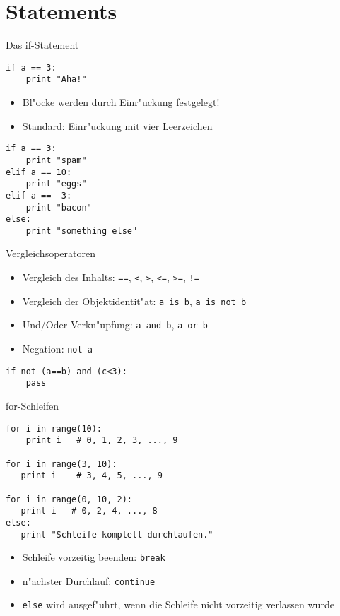 \section{Statements}

\begin{frame}[fragile]{Das if-Statement}
\begin{lstlisting}[style=Python]
if a == 3:
    print "Aha!"
\end{lstlisting}
\begin{itemize}
\item Bl"ocke werden durch Einr"uckung festgelegt!
\item Standard: Einr"uckung mit vier Leerzeichen
\end{itemize}
\begin{lstlisting}
if a == 3:
    print "spam"
elif a == 10:
    print "eggs"
elif a == -3:
    print "bacon"
else:
    print "something else"
\end{lstlisting}
\end{frame}

\begin{frame}[fragile]{Vergleichsoperatoren}
\begin{itemize}
\item Vergleich des Inhalts: \texttt{==}, \texttt{<}, \texttt{>}, \texttt{<=}, \texttt{>=}, \texttt{!=}
\item Vergleich der Objektidentit"at: \lstinline{a is b}, \lstinline{a is not b}\item Und/Oder-Verkn"upfung: \lstinline{a and b}, \lstinline{a or b}
\item Negation: \lstinline{not a}
\end{itemize}
\begin{lstlisting}
if not (a==b) and (c<3):
    pass
\end{lstlisting}
\end{frame}

\begin{frame}[fragile]{for-Schleifen}
\begin{lstlisting}[style=Python]
for i in range(10):
    print i   # 0, 1, 2, 3, ..., 9

for i in range(3, 10):
   print i    # 3, 4, 5, ..., 9

for i in range(0, 10, 2):
   print i   # 0, 2, 4, ..., 8
else:
   print "Schleife komplett durchlaufen."
\end{lstlisting}
\begin{itemize}
\item Schleife vorzeitig beenden: \lstinline{break}
\item n"achster Durchlauf: \lstinline{continue}
\item \lstinline{else} wird ausgef"uhrt, wenn die Schleife nicht vorzeitig verlassen wurde
\end{itemize}
\end{frame}

